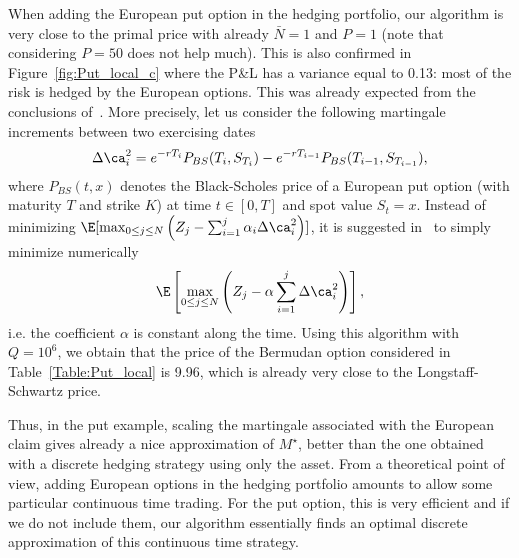When adding the European put option in the hedging portfolio, our algorithm is very close to the primal price with already $\bar{N}=1$ and $P=1$ (note that considering $P=50$ does not help much). This is also confirmed in Figure~\ref{fig:Put_local_c} where the P\&L has a variance equal to 0.13: most of the risk is hedged by the European options. This was already expected from the conclusions of~\cite{rogers-02}. More precisely, let us consider the following martingale increments between two exercising dates
$$\Delta \ca^2_i=e^{-rT_i}P_{BS}(T_i,S_{T_i})- e^{-rT_{i-1}}P_{BS}(T_{i-1},S_{T_{i-1}}),$$ 
where $P_{BS}(t,x)$ denotes the Black-Scholes price of a European put option (with maturity $T$ and strike $K$) at time $t\in [0,T]$ and spot value $S_t=x$.  
Instead of minimizing $\E[\max_{0\le j\le N}\left(Z_j-\sum_{i=1}^j \alpha_i \Delta \ca^2_i \right)]$, it is suggested in~\cite{rogers-02} to simply minimize numerically
\begin{equation}\label{Rogers_algo}\E\left[\max_{0\le j\le N}\left(Z_j- \alpha \sum_{i=1}^j \Delta \ca^2_i \right)\right],
\end{equation}
i.e. the coefficient $\alpha$ is constant along the time. Using this algorithm with $Q=10^6$, we obtain that the price of the Bermudan option considered in Table~\ref{Table:Put_local} is 9.96, which is already very close to the Longstaff-Schwartz price. 

Thus, in the put example, scaling the martingale associated with the European claim gives already a nice approximation of $M^\star$, better than the one obtained with a discrete hedging strategy using only the asset. From a theoretical point of view, adding European options in the hedging portfolio amounts to allow some particular continuous time trading. For the put option, this is very efficient and if we do not include them, our algorithm essentially finds an optimal discrete approximation of this continuous time strategy. 

